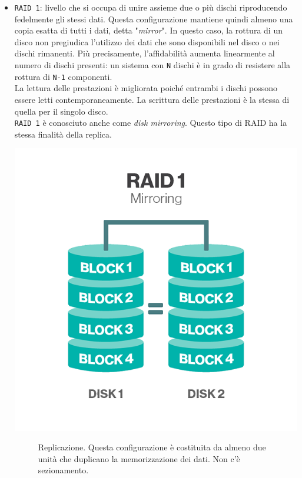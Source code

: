 \begin{itemize}
\item 
\verb"RAID 1": livello che si occupa di unire assieme due o pi\`{u} dischi riproducendo fedelmente gli stessi dati. Questa configurazione mantiene quindi almeno una copia esatta di tutti i dati, detta "\textit{mirror}". In questo caso, la rottura di un disco non pregiudica l'utilizzo dei dati che sono disponibili nel disco o nei dischi rimanenti. Pi\`{u} precisamente, l'affidabilit\`{a} aumenta linearmente al numero di dischi presenti: un sistema con \verb"N" dischi \`{e} in grado di resistere alla rottura di \verb"N-1" componenti.\\ La lettura delle prestazioni \`{e} migliorata poich\'{e} entrambi i dischi possono essere letti contemporaneamente. La scrittura delle prestazioni \`{e} la stessa di quella per il singolo disco.\cite{etichetta9} \\
\verb"RAID 1" \`{e} conosciuto anche come \textit{disk mirroring}. Questo tipo di RAID ha la stessa finalit\`{a} della replica.\\


\begin{center}
\includegraphics[scale=0.40]{img/raid11.png}
\end{center}

\begin{figure}[htbp]
\caption{Replicazione. Questa configurazione \`{e} costituita da almeno due unit\`{a} che duplicano la memorizzazione dei dati. Non c'\`{e} sezionamento.\label{figura1.4} \cite{etichetta9}}
\end{figure}


\end{itemize}

